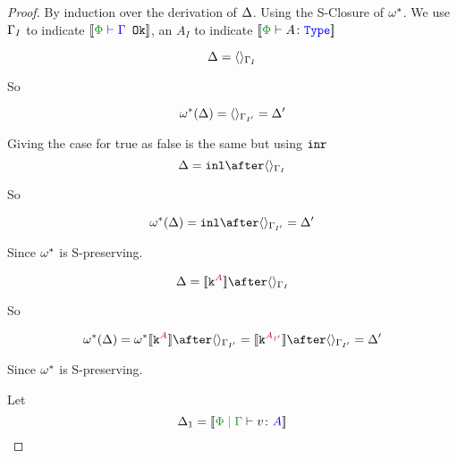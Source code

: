 \documentclass{report}
\begin{document}
\begin{framed}
    \begin{proof}
        By induction over the derivation of $\Delta$. Using the S-Closure of $\omega^*$. We use $\Gamma_I$ to indicate $\deno{\wellformedok{\P}{\G}}$, an $A_I$ to indicate $\deno{\typerelation{\P}{A}{\type}}$
        
        \case{\vunit}
        
        \begin{equation}
            \Delta = \langle\rangle_{\Gamma_I}
        \end{equation}
        
        So
        
        \begin{equation}
            \omega^*(\Delta) = \langle\rangle_{\Gamma_{I'}} = \Delta'
        \end{equation}
        
        \case{\vtrue, \vfalse}
        Giving the case for true as false is the same but using $\texttt{inr}$
        \begin{equation}
            \D = \inl\after\term{\G_I}
        \end{equation}
        
        So
        
        \begin{equation}
            \w\star(\D) = \inl\after \term{\G_{I'}} = \D'
        \end{equation}
        
        Since $\omega^*$ is S-preserving.
        
        \case{\vconst}
        
        
        \begin{equation}
            \D = \deno{\const{A}}\after\term{\G_I}
        \end{equation}
        
        So
        
        \begin{equation}
            \w\star(\D) = \w\star\deno{\const{A}}\after \term{\G_{I'}}=\deno{\const{A_{I'}}}\after \term{\G_{I'}}  = \D'
        \end{equation}
        
        Since $\omega^*$ is S-preserving.
        
        \case{\vsubtype}
        
        Let \begin{equation}
            \D_1 = \deno{\gpetyperelation{v}{A}}
        \end{equation}
        

\end{proof}
\end{framed}
\end{document}
